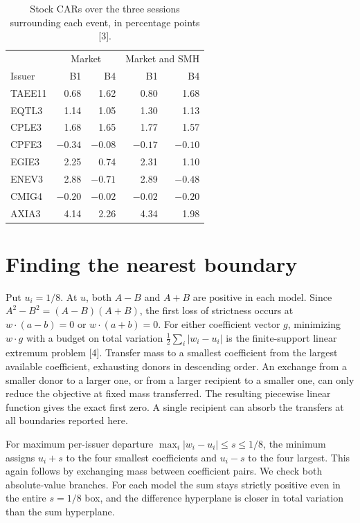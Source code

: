 \documentclass[11pt]{article}
\begin{document}
\begin{table}[ht]\centering\caption{Stock CARs over the three sessions surrounding each event, in percentage points [3].}\label{raw}
\begin{tabular}{lrrrr}\toprule
&\multicolumn{2}{c}{Market}&\multicolumn{2}{c}{Market and SMH}\\
Issuer & B1 & B4 & B1 & B4\\\midrule
TAEE11 &0.68&1.62&0.80&1.68\\ EQTL3 &1.14&1.05&1.30&1.13\\
CPLE3 &1.68&1.65&1.77&1.57\\ CPFE3 &$-0.34$&$-0.08$&$-0.17$&$-0.10$\\
EGIE3 &2.25&0.74&2.31&1.10\\ ENEV3 &2.88&$-0.71$&2.89&$-0.48$\\
CMIG4 &$-0.20$&$-0.02$&$-0.02$&$-0.20$\\ AXIA3 &4.14&2.26&4.34&1.98\\\bottomrule
\end{tabular}\end{table}

\section{Finding the nearest boundary}
Put $u_i=1/8$. At $u$, both $A-B$ and $A+B$ are positive in each model. Since $A^2-B^2=(A-B)(A+B)$, the first loss of strictness occurs at $w\cdot(a-b)=0$ or $w\cdot(a+b)=0$. For either coefficient vector $g$, minimizing $w\cdot g$ with a budget on total variation $\frac12\sum_i|w_i-u_i|$ is the finite-support linear extremum problem [4]. Transfer mass to a smallest coefficient from the largest available coefficient, exhausting donors in descending order. An exchange from a smaller donor to a larger one, or from a larger recipient to a smaller one, can only reduce the objective at fixed mass transferred. The resulting piecewise linear function gives the exact first zero. A single recipient can absorb the transfers at all boundaries reported here.

For maximum per-issuer departure $\max_i|w_i-u_i|\leq s\leq 1/8$, the minimum assigns $u_i+s$ to the four smallest coefficients and $u_i-s$ to the four largest. This again follows by exchanging mass between coefficient pairs. We check both absolute-value branches. For each model the sum stays strictly positive even in the entire $s=1/8$ box, and the difference hyperplane is closer in total variation than the sum hyperplane.
\end{document}

